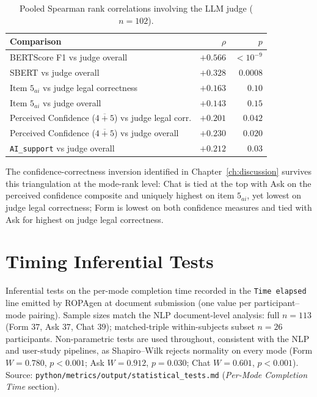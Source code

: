 \begin{table}[H]
\centering
\small
\begin{tabular}{@{}l r r@{}}
\toprule
Comparison & $\rho$ & $p$ \\
\midrule
BERTScore F1 vs judge overall            & $+0.566$ & $< 10^{-9}$ \\
SBERT vs judge overall                   & $+0.328$ & $0.0008$ \\
Item $5_{ai}$ vs judge legal correctness                       & $+0.163$ & $0.10$ \\
Item $5_{ai}$ vs judge overall                                 & $+0.143$ & $0.15$ \\
Perceived Confidence ($\overline{4{+}5}$) vs judge legal corr. & $+0.201$ & $0.042$ \\
Perceived Confidence ($\overline{4{+}5}$) vs judge overall     & $+0.230$ & $0.020$ \\
\texttt{AI\_support} vs judge overall                          & $+0.212$ & $0.03$ \\
\bottomrule
\end{tabular}
\caption{Pooled Spearman rank correlations involving the LLM
judge ($n = 102$).}
\label{tab:app-corr-judge-pooled}
\end{table}

The confidence-correctness inversion identified in
Chapter~\ref{ch:discussion} survives this triangulation at the
mode-rank level: Chat is tied at the top with Ask on the perceived
confidence composite and uniquely highest on item $5_{ai}$, yet
lowest on judge legal correctness; Form is lowest on both
confidence measures and tied with Ask for highest on judge legal
correctness.

\section{Timing Inferential Tests}
\label{app:inf-timing}

Inferential tests on the per-mode completion time recorded in the
\texttt{Time elapsed} line emitted by ROPAgen at document submission
(one value per participant--mode pairing). Sample sizes match the NLP
document-level analysis: full $n = 113$ (Form $37$, Ask $37$, Chat
$39$); matched-triple within-subjects subset $n = 26$ participants.
Non-parametric tests are used throughout, consistent with the NLP and
user-study pipelines, as Shapiro--Wilk rejects normality on every
mode (Form $W = 0.780$, $p < 0.001$; Ask $W = 0.912$, $p = 0.030$;
Chat $W = 0.601$, $p < 0.001$). Source:
\texttt{python/\allowbreak{}metrics/\allowbreak{}output/\allowbreak{}statistical\_tests.md}
(\emph{Per-Mode Completion Time} section).

